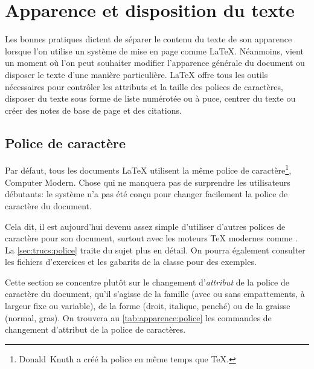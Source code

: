 \chapter{Apparence et disposition du texte}
\label{chap:apparence}


Les bonnes pratiques dictent de séparer le contenu du texte de son
apparence lorsque l'on utilise un système de mise en page comme
{\LaTeX}. Néanmoins, vient un moment où l'on peut souhaiter modifier
l'apparence générale du document ou disposer le texte d'une manière
particulière. {\LaTeX} offre tous les outils nécessaires pour
contrôler les attributs et la taille des polices de caractères,
disposer du texte sous forme de liste numérotée ou à puce, centrer du
texte ou créer des notes de base de page et des citations.

\section{Police de caractère}
\label{sec:apparence:police}

Par défaut, tous les documents {\LaTeX} utilisent la même police de
caractère\footnote{%
  Donald~Knuth a créé la police en même temps que {\TeX}.}, %
{\selectfont Computer Modern}. Chose qui ne manquera
pas de surprendre les utilisateurs débutants: le système n'a pas été
conçu pour changer facilement la police de caractère du document.

Cela dit, il est aujourd'hui devenu assez simple d'utiliser d'autres
polices de caractère pour son document, surtout avec les moteurs
{\TeX} modernes comme {\XeTeX}. La \autoref{sec:trucs:police} traite
du sujet plus en détail. On pourra également consulter les fichiers
d'exercices et les gabarits de la classe  pour des
exemples.

Cette section se concentre plutôt sur le changement d'\emph{attribut}
de la police de caractère du document, qu'il s'agisse de la famille
(avec ou sans empattements, à largeur fixe ou variable), de la forme
(droit, italique, penché) ou de la graisse (normal, gras). On trouvera
au \autoref{tab:apparence:police} les commandes de changement
d'attribut de la police de caractères.

